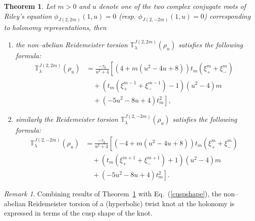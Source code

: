 \documentclass[a4paper]{amsart}
\theoremstyle{plain}
\newtheorem{theorem}{Theorem}
\theoremstyle{definition}
\theoremstyle{remark}
\newtheorem{remark}{Remark}%
\begin{document}
%
\begin{theorem}\label{R-torsionTK}
Let $m>0$ and $u$ denote one of the two complex conjugate roots of Riley's equation $\phi_{J(2, 2m)}(1,u) = 0$ (resp. $\phi_{J(2, -2m)}(1,u) = 0$) corresponding to holonomy representations, 
then 
\begin{enumerate}
\item the non--abelian Reidemeister torsion ${\mathbb T}^{J(2, 2m)}_{\lambda}(\rho_u)$ satisfies the following
{formula}:
\begin{align*}
{\mathbb T}^{J(2, 2m)}_{\lambda}(\rho_u)
&= 
  \frac{-\tau_0}{u^2+4}
  \left[
    \left(4+m(u^2-4u+8)\right) t_m (\xi_{+}^m + \xi_{-}^m) 
    \right. \nonumber \\
& \quad + 
    \left(t_m(\xi_{+}^{m-1}+\xi_{-}^{m-1})-1\right)(u^2-4)m \nonumber\\
& \left.\quad+
    (-5u^2-8u+4)t_m^2
  \right],
\end{align*}
\item similarly
the Reidemeister torsion ${\mathbb T}^{J(2, -2m)}_{\lambda}(\rho_u)$ satisfies the following
formula:
\begin{align*}
{\mathbb T}^{J(2, -2m)}_{\lambda}(\rho_u)
&= 
  \frac{-\tau_0}{u^2+4}
  \left[
    \left(-4+m(u^2-4u+8)\right) t_m (\xi_{+}^m + \xi_{-}^m) 
    \right. \nonumber \\
& \quad + 
    \left(t_m(\xi_{+}^{m+1}+\xi_{-}^{m+1}) +1\right)(u^2-4)m \nonumber\\
& \left.\quad+
    (-5u^2-8u+4)t_m^2
 \right].
\end{align*}
\end{enumerate}
\end{theorem}
%
\begin{remark}
Combining results of Theorem~\ref{R-torsionTK} with Eq.~(\ref{cuspshape}), the non--abelian Reidemeister torsion of a (hyperbolic) twist knot at the holonomy is expressed in terms of the cusp shape of the knot.
\end{remark}
%
\end{document}
